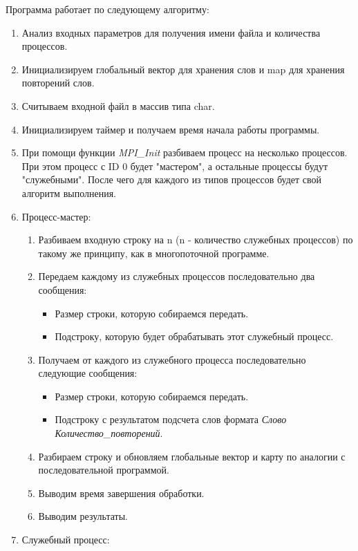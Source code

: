 \documentclass[12pt,a4paper]{report}
\begin{document}
					Программа работает по следующему алгоритму:
					\begin{enumerate}
						\item Анализ входных параметров для получения имени файла и количества процессов.
						\item Инициализируем глобальный вектор для хранения слов и map для хранения повторений слов.
						\item Считываем входной файл в массив типа char.
						\item Инициализируем таймер и получаем время начала работы программы.
						\item При помощи функции \textit{MPI\_Init} разбиваем процесс на несколько процессов. При этом процесс с ID 0 будет "мастером", а остальные процессы будут "служебными". После чего для каждого из типов процессов будет свой алгоритм выполнения.
						\item Процесс-мастер:
							\begin{enumerate}
								\item Разбиваем входную строку на n (n - количество служебных процессов) по такому же принципу, как в многопоточной программе.
								\item Передаем каждому из служебных процессов последовательно два сообщения:
									\begin{itemize}
										\item Размер строки, которую собираемся передать.
										\item Подстроку, которую будет обрабатывать этот служебный процесс.
									\end{itemize}
								\item Получаем от каждого из служебного процесса последовательно следующие сообщения:
									\begin{itemize}
										\item Размер строки, которую собираемся передать.
										\item Подстроку с результатом подсчета слов формата \textit{Слово Количество\_повторений}.
									\end{itemize}
								\item Разбираем строку и обновляем глобальные вектор и карту по аналогии с последовательной программой.
								\item Выводим время завершения обработки.
								\item Выводим результаты.
							\end{enumerate}
						\item Служебный процесс:

\end{enumerate}
\end{document}
